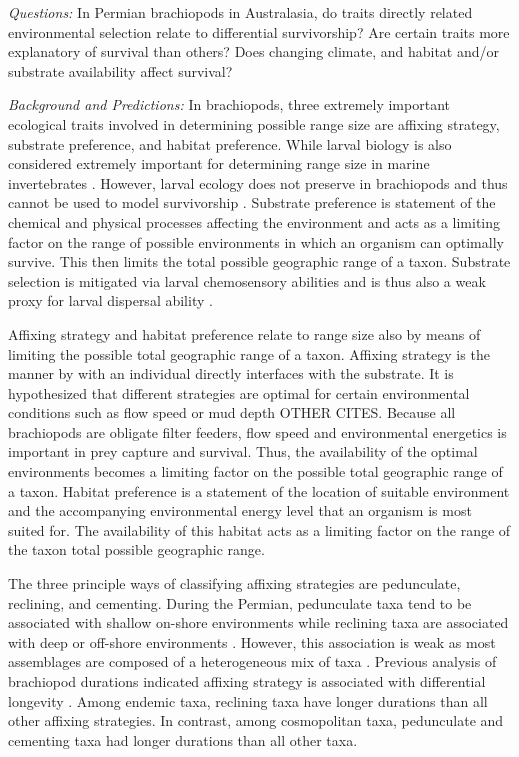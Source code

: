 \documentclass[12pt,letterpaper]{article}
\begin{document}
\textit{Questions:} In Permian brachiopods in Australasia, do traits directly related environmental selection relate to differential survivorship? Are certain traits more explanatory of survival than others? Does changing climate, and habitat and/or substrate availability affect survival?

\textit{Background and Predictions:}
In brachiopods, three extremely important ecological traits involved in determining possible range size are affixing strategy, substrate preference, and habitat preference. While larval biology is also considered extremely important for determining range size in marine invertebrates \citep{Jablonski2006a,Jablonski1983}. However, larval ecology does not preserve in brachiopods and thus cannot be used to model survivorship \citep{Jablonski1983}. Substrate preference is statement of the chemical and physical processes affecting the environment and acts as a limiting factor on the range of possible environments in which an organism can optimally survive. This then limits the total possible geographic range of a taxon. Substrate selection is mitigated via larval chemosensory abilities and is thus also a weak proxy for larval dispersal ability \citep{Jablonski2006a,Jablonski1983}. 

Affixing strategy and habitat preference relate to range size also by means of limiting the possible total geographic range of a taxon. Affixing strategy is the manner by with an individual directly interfaces with the substrate. It is hypothesized that different strategies are optimal for certain environmental conditions such as flow speed or mud depth \citep{Alexander1977} OTHER CITES. Because all brachiopods are obligate filter feeders, flow speed and environmental energetics is important in prey capture and survival. Thus, the availability of the optimal environments becomes a limiting factor on the possible total geographic range of a taxon. Habitat preference is a statement of the location of suitable environment and the accompanying environmental energy level that an organism is most suited for. The availability of this habitat acts as a limiting factor on the range of the taxon total possible geographic range. 

The three principle ways of classifying affixing strategies are pedunculate, reclining, and cementing. During the Permian, pedunculate taxa tend to be associated with shallow on-shore environments while reclining taxa are associated with deep or off-shore environments \citep{Clapham2007}. However, this association is weak as most assemblages are composed of a heterogeneous mix of taxa \citep{Clapham2007}. Previous analysis of brachiopod durations indicated affixing strategy is associated with differential longevity \citep{Alexander1977}. Among endemic taxa, reclining taxa have longer durations than all other affixing strategies. In contrast, among cosmopolitan taxa, pedunculate and cementing taxa had longer durations than all other taxa. 
\end{document}
